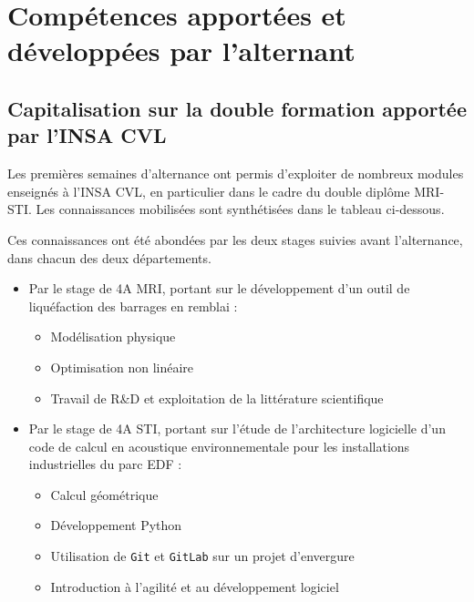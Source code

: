 \chapter{Compétences apportées et développées par l'alternant}\label{ch:competences-apportees-et-developpees-par-l'alternant}


\section{Capitalisation sur la double formation apportée par l'INSA CVL}\label{sec:capitalisation-sur-la-double-formation-apportee-par-l'insa-cvl}

Les premières semaines d'alternance ont permis d'exploiter de nombreux modules enseignés à l'INSA CVL, en particulier dans le cadre du double diplôme \gls{MRI}-\gls{STI}.
Les connaissances mobilisées sont synthétisées dans le tableau ci-dessous.

Ces connaissances ont été abondées par les deux stages suivies avant l'alternance, dans chacun des deux départements.

\begin{itemize}
    \item Par le stage de 4A \gls{MRI}, portant sur le développement d'un outil de liquéfaction des barrages en remblai :
    \begin{itemize}
        \item Modélisation physique
        \item Optimisation non linéaire
        \item Travail de R\&D et exploitation de la littérature scientifique
    \end{itemize}
    \item Par le stage de 4A \gls{STI}, portant sur l'étude de l'architecture logicielle d'un code de calcul en \gls{acoustique} environnementale pour les installations industrielles du parc EDF :
    \begin{itemize}
        \item Calcul géométrique
        \item Développement Python
        \item Utilisation de \texttt{Git} et \texttt{GitLab} sur un projet d'envergure
        \item Introduction à l'agilité et au développement logiciel
    \end{itemize}
\end{itemize}

